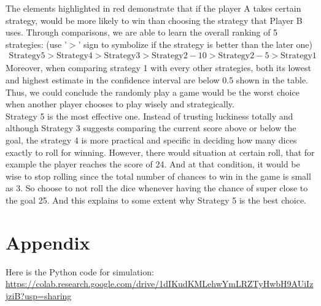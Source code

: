 \documentclass[12pt]{article}
\begin{document}
The elements highlighted in red demonstrate that if the player A takes certain strategy, would be more likely to win than choosing the strategy that Player B uses. Through comparisons, we are able to learn the overall ranking of 5 strategies:
(use '$>$' sign to symbolize if the strategy is better than the later one)
\begin{align*}
\text{Strategy} 5 > \text{Strategy} 4 > \text{Strategy} 3 > \text{Strategy} 2-10 > \text{Strategy} 2-5 > \text{Strategy} 1 
\end{align*}
Moreover, when comparing strategy 1 with every other strategies, both its lowest and highest estimate in the confidence interval are below 0.5 shown in the table. Thus, we could conclude the randomly play a game would be the worst choice when another player chooses to play wisely and strategically. \\
Strategy 5 is the most effective one. Instead of trusting luckiness totally and although Strategy 3 suggests comparing the current score above or below the goal, the strategy 4 is more practical and specific in deciding how many dices exactly to roll for winning. However, there would situation at certain roll, that for example the player reaches the score of 24. And at that condition, it would be wise to stop rolling since the total number of chances to win in the game is small as 3. So choose to not roll the dice whenever having the chance of super close to the goal 25. And this explains to some extent why Strategy 5 is the best choice. 
\section{Appendix}
Here is the Python code for simulation:\\
\url{https://colab.research.google.com/drive/1dIKudKMLehwYmLRZTyHwbH9AUiIzjziB?usp=sharing}
\end{document}
